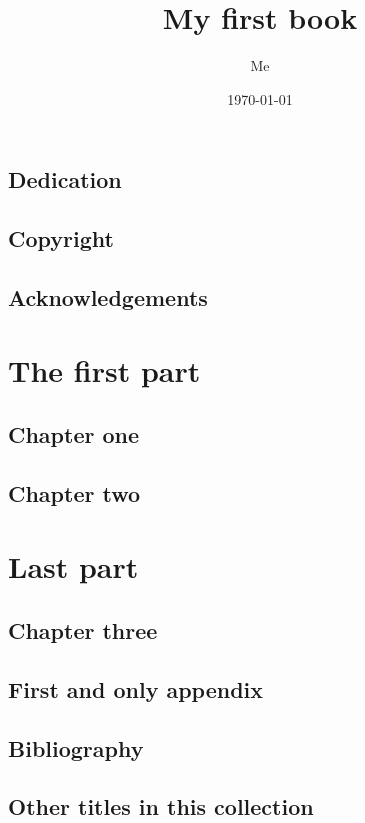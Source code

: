 \documentclass{book}
\title{My first book}
\author{Me}
\date{\today}
\begin{document}
\maketitle

\frontmatter
\chapter{Dedication}
\chapter{Copyright}
\chapter{Acknowledgements}

\tableofcontents

\listoffigures
\listoftables

\mainmatter
\part{The first part}
\chapter{Chapter one}
\chapter{Chapter two}

\part{Last part}
\chapter{Chapter three}

\appendix
\chapter{First and only appendix}

\backmatter
\chapter{Bibliography}
\chapter{Other titles in this collection}
\end{document}
